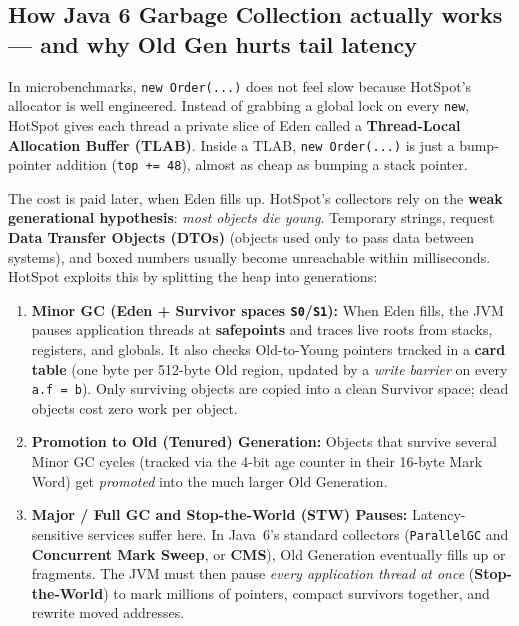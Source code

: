 \subsection{How Java 6 Garbage Collection actually works --- and why Old Gen hurts tail latency}

In microbenchmarks, \texttt{new Order(...)} does not feel slow because HotSpot's allocator is well engineered. Instead of grabbing a global lock on every \texttt{new}, HotSpot gives each thread a private slice of Eden called a \textbf{Thread-Local Allocation Buffer (TLAB)}. Inside a TLAB, \texttt{new Order(...)} is just a bump-pointer addition (\texttt{top += 48}), almost as cheap as bumping a stack pointer.

The cost is paid later, when Eden fills up. HotSpot's collectors rely on the \textbf{weak generational hypothesis}: \emph{most objects die young}. Temporary strings, request \textbf{Data Transfer Objects (DTOs)} (objects used only to pass data between systems), and boxed numbers usually become unreachable within milliseconds. HotSpot exploits this by splitting the heap into generations:

\begin{enumerate}
  \item \textbf{Minor GC (Eden + Survivor spaces \texttt{S0}/\texttt{S1}):} When Eden fills, the JVM pauses application threads at \textbf{safepoints} and traces live roots from stacks, registers, and globals. It also checks Old-to-Young pointers tracked in a \textbf{card table} (one byte per 512-byte Old region, updated by a \emph{write barrier} on every \texttt{a.f = b}). Only surviving objects are copied into a clean Survivor space; dead objects cost zero work per object.
  \item \textbf{Promotion to Old (Tenured) Generation:} Objects that survive several Minor GC cycles (tracked via the 4-bit age counter in their 16-byte Mark Word) get \emph{promoted} into the much larger Old Generation.
  \item \textbf{Major / Full GC and Stop-the-World (STW) Pauses:} Latency-sensitive services suffer here. In Java~6's standard collectors (\texttt{ParallelGC} and \textbf{Concurrent Mark Sweep}, or \textbf{CMS}), Old Generation eventually fills up or fragments. The JVM must then pause \emph{every application thread at once} (\textbf{Stop-the-World}) to mark millions of pointers, compact survivors together, and rewrite moved addresses.
\end{enumerate}

